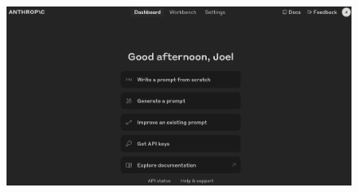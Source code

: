 \documentclass{beamer}
\begin{document}
\begin{frame}
\begin{figure}
    \centering
    \includegraphics[width=1\linewidth]{../images/cs12-prompt-anthropic_console.png}
\end{figure}
\end{frame}
\end{document}
